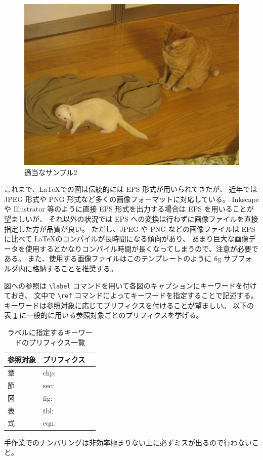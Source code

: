 \begin{figure}[H]
  \centering
  \includegraphics[width=6.4truecm]{./fig/ferret.png}
  \caption{適当なサンプル2}
  \label{fig:ferret}
\end{figure}

これまで、\LaTeX での図は伝統的には EPS 形式が用いられてきたが、
近年では JPEG 形式や PNG 形式など多くの画像フォーマットに対応している。
Inkscape や Illustrator 等のように直接 EPS 形式を出力する場合は EPS を用いることが望ましいが、
それ以外の状況では EPS への変換は行わずに画像ファイルを直接指定した方が品質が良い。
ただし、JPEG や PNG などの画像ファイルは EPS に比べて \LaTeX のコンパイルが長時間になる傾向があり、
あまり巨大な画像データを使用するとかなりコンパイル時間が長くなってしまうので、注意が必要である。
また、使用する画像ファイルはこのテンプレートのように
fig サブフォルダ内に格納することを推奨する。

図への参照は \verb+\label+ コマンドを用いて各図のキャプションにキーワードを付けておき、
文中で \verb+\ref+ コマンドによってキーワードを指定することで記述する。
キーワードは参照対象に応じてプリフィクスを付けることが望ましい。
以下の表 \ref{tbl:pre_list} に一般的に用いる参照対象ごとのプリフィクスを挙げる。

\begin{table}[H]
  \caption{ラベルに指定するキーワードのプリフィクス一覧}
  \label{tbl:pre_list}
  \centering
  \begin{tabular}{|l|l|r|} \hline
   参照対象	& プリフィクス \\ \hline
   章		& chp: \\ \hline
   節		& sec: \\ \hline
   図		& fig: \\ \hline
   表 		& tbl: \\ \hline
   式   	& eqn: \\ \hline
  \end{tabular}
\end{table}
手作業でのナンバリングは非効率極まりない上に必ずミスが出るので行わないこと。


